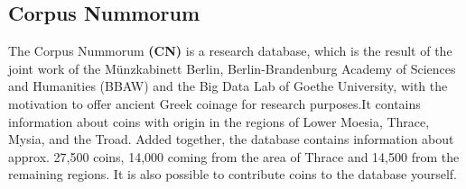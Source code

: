 \documentclass[12pt, oneside]{article}
\begin{document}
\subsection{Corpus Nummorum} \label{cn}
The Corpus Nummorum \textbf{(CN)} is a  research database, which is  the result of the joint work of the Münzkabinett Berlin, Berlin-Brandenburg Academy of Sciences and Humanities (BBAW) and the Big Data Lab of Goethe University, with the motivation to offer ancient Greek coinage for research purposes.\footnotemark[1]
It contains information about coins with origin in the regions of Lower Moesia, Thrace, Mysia, and the Troad. Added together, the database contains information about approx. 27,500 coins, 14,000 coming from the area of Thrace and 14,500 from the remaining regions. It is also possible to contribute coins to the database yourself.
\end{document}
